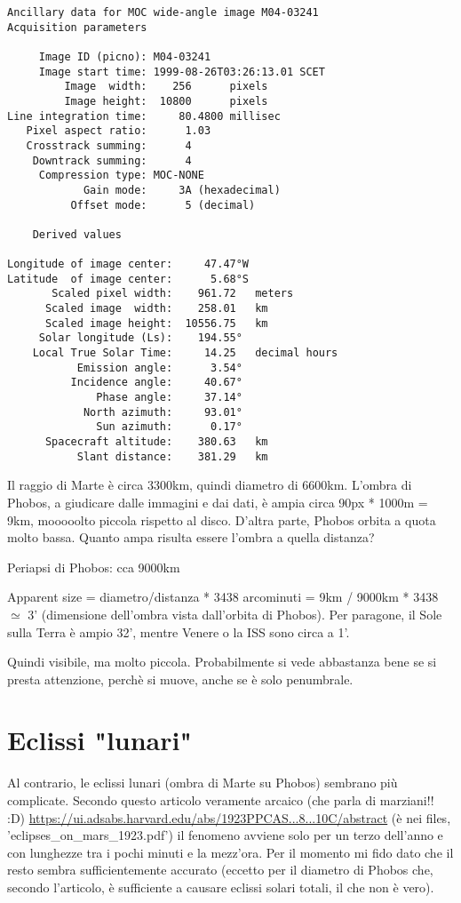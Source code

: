 \documentclass[a4paper,10pt,openany,oneside]{memoir}
\begin{document}
\begin{verbatim}
Ancillary data for MOC wide-angle image M04-03241
Acquisition parameters

     Image ID (picno): M04-03241
     Image start time: 1999-08-26T03:26:13.01 SCET
         Image  width:    256      pixels
         Image height:  10800      pixels
Line integration time:     80.4800 millisec
   Pixel aspect ratio:      1.03
   Crosstrack summing:      4
    Downtrack summing:      4
     Compression type: MOC-NONE
            Gain mode:     3A (hexadecimal)
          Offset mode:      5 (decimal)

	Derived values

Longitude of image center:     47.47°W
Latitude  of image center:      5.68°S
       Scaled pixel width:    961.72   meters
      Scaled image  width:    258.01   km
      Scaled image height:  10556.75   km
     Solar longitude (Ls):    194.55°
    Local True Solar Time:     14.25   decimal hours
           Emission angle:      3.54°
          Incidence angle:     40.67°
              Phase angle:     37.14°
            North azimuth:     93.01°
              Sun azimuth:      0.17°
      Spacecraft altitude:    380.63   km
           Slant distance:    381.29   km
\end{verbatim}


Il raggio di Marte è circa 3300km, quindi diametro di 6600km. L'ombra di Phobos, a giudicare dalle immagini e dai dati, è ampia circa 90px * 1000m = 9km, mooooolto piccola rispetto al disco. D'altra parte, Phobos orbita a quota molto bassa. Quanto ampa risulta essere l'ombra a quella distanza?

Periapsi di Phobos: cca 9000km

Apparent size  = diametro/distanza * 3438 arcominuti = 9km / 9000km * 3438 $\simeq$ 3' (dimensione dell'ombra vista dall'orbita di Phobos). Per paragone, il Sole sulla Terra è ampio 32', mentre Venere o la ISS sono circa a 1'.

Quindi visibile, ma molto piccola. Probabilmente si vede abbastanza bene se si presta attenzione, perchè si muove, anche se è solo penumbrale.

\section{Eclissi "lunari"}

Al contrario, le eclissi lunari (ombra di Marte su Phobos) sembrano più complicate. Secondo questo articolo veramente arcaico (che parla di marziani!! :D) \url{https://ui.adsabs.harvard.edu/abs/1923PPCAS...8...10C/abstract} (è nei files, 'eclipses\_on\_mars\_1923.pdf') il fenomeno avviene solo per un terzo dell'anno e con lunghezze tra i pochi minuti e la mezz'ora. Per il momento mi fido dato che il resto sembra sufficientemente accurato (eccetto per il diametro di Phobos che, secondo l'articolo, è sufficiente a causare eclissi solari totali, il che non è vero).
\end{document}
